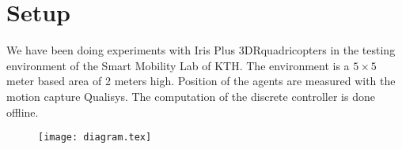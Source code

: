 \section{Setup}
We have been doing experiments with Iris Plus 3DR\trademark quadricopters in the testing environment of the Smart Mobility Lab of KTH.
The environment is a $5\times5$ meter based area of 2 meters high.
Position of the agents are measured with the motion capture Qualisys\trademark.
The computation of the discrete controller is done offline.

\begin{figure}
\texttt{[image: diagram.tex]}
\end{figure}